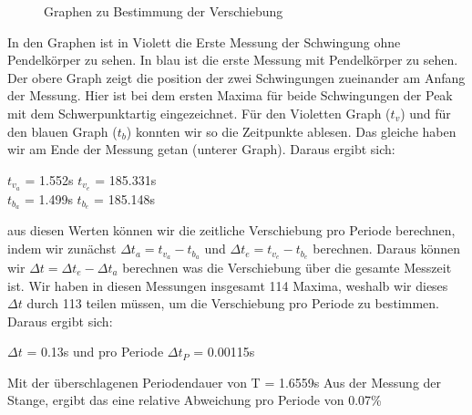 \documentclass[twoside]{protokoll}
\begin{document}
\begin{figure}[H]
    \centering
    \hfill
    \caption{Graphen zu Bestimmung der Verschiebung}
    \end{figure}

In den Graphen ist in Violett die Erste Messung der Schwingung ohne Pendelkörper zu sehen.
In blau ist die erste Messung mit Pendelkörper zu sehen. 
Der obere Graph zeigt die position der zwei Schwingungen zueinander am Anfang der Messung. 
Hier ist bei dem ersten Maxima für beide Schwingungen der Peak mit dem Schwerpunktartig eingezeichnet. 
Für den Violetten Graph ($t_v$) und für den blauen Graph ($t_b$) konnten wir so die Zeitpunkte ablesen. 
Das gleiche haben wir am Ende der Messung getan (unterer Graph).
Daraus ergibt sich:
\begin{center}
$t_{v_a}$ = 1.552s \qquad $t_{v_e}$ = 185.331s\\
$t_{b_a}$ = 1.499s \qquad $t_{b_e}$ = 185.148s
\end{center}

aus diesen Werten können wir die zeitliche Verschiebung pro Periode berechnen, indem wir zunächst $ \Delta t_a = t_{v_a}-t_{b_a}$ und $ \Delta t_e = t_{v_e}-t_{b_e}$ berechnen.
Daraus können wir $ \Delta t = \Delta t_e - \Delta t_a $ berechnen was die Verschiebung über die gesamte Messzeit ist.
Wir haben in diesen Messungen insgesamt 114 Maxima, weshalb wir dieses $\Delta t$ durch 113 teilen müssen, um die Verschiebung pro Periode zu bestimmen. 
Daraus ergibt sich:
\begin{center}
$\Delta t $ = 0.13s \qquad und pro Periode \quad $\Delta t_P$ = 0.00115s
\end{center}
Mit der überschlagenen Periodendauer von T = 1.6559s Aus der Messung der Stange, ergibt das eine relative Abweichung pro Periode von 0.07\% 
\end{document}
